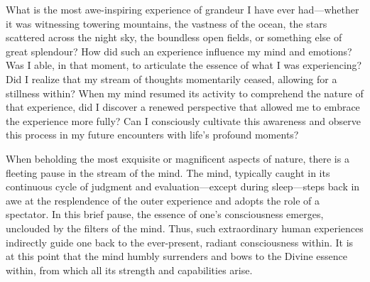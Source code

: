 \newpage
\begin{mananam}{}
\normalfont\mananamtext What is the most awe-inspiring experience of grandeur I have ever had—whether it was witnessing towering mountains, the vastness of the ocean, the stars scattered across the night sky, the boundless open fields, or something else of great splendour? How did such an experience influence my mind and emotions? 
Was I able, in that moment, to articulate the essence of what I was experiencing? Did I realize that my stream of thoughts momentarily ceased, allowing for a stillness within? When my mind resumed its activity to comprehend the nature of that experience, did I discover a renewed perspective that allowed me to embrace the experience more fully? Can I consciously cultivate this awareness and observe this process in my future encounters with life’s profound moments?
\end{mananam}
\sreflect
\begin{inspiration}{}
\normalfont\mananamtext When beholding the most exquisite or magnificent aspects of nature, there is a fleeting pause in the stream of the mind. The mind, typically caught in its continuous cycle of judgment and evaluation—except during sleep—steps back in awe at the resplendence of the outer experience and adopts the role of a spectator. In this brief pause, the essence of one’s consciousness emerges, unclouded by the filters of the mind. Thus, such extraordinary human experiences indirectly guide one back to the ever-present, radiant consciousness within. It is at this point that the mind humbly surrenders and bows to the Divine essence within, from which all its strength and capabilities arise.
\end{inspiration}
\newpage

